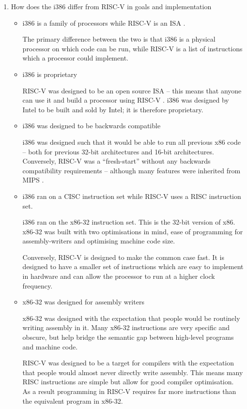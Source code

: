 \documentclass[10pt,\jkfside,a4paper]{article}
\begin{document}
\begin{enumerate}
\begin{itemize}
\end{itemize}

\item How does the i386 differ from RISC-V in goals and implementation

\begin{itemize}

\item i386 is a family of processors while RISC-V is an ISA .

The primary difference between the two is that i386 is a physical processor
on which code can be run, while RISC-V is a list of instructions which a
processor could implement.

\item i386 is proprietary

RISC-V was designed to be an open source ISA -- this means that anyone can
use it and build a processor using RISC-V . i386 was designed by Intel to be
built and sold by Intel; it is therefore proprietary.

\item i386 was designed to be backwards compatible

i386 was designed such that it would be able to run all previous x86 code --
both for previous 32-bit architectures and 16-bit architectures. Conversely,
RISC-V was a ``fresh-start'' without any backwards compatibility
requirements -- although many features were inherited from MIPS .

\item i386 ran on a CISC instruction set while RISC-V uses a RISC
instruction set.

i386 ran on the x86-32 instruction set. This is the 32-bit version of x86.
x86-32 was built with two optimisations in mind, ease of programming for
assembly-writers and optimising machine code size.

Conversely, RISC-V is designed to make the common case fast. It is designed
to have a smaller set of instructions which are easy to implement in
hardware and can allow the processor to run at a higher clock frequency.

\item x86-32 was designed for assembly writers

x86-32 was designed with the expectation that people would be routinely
writing assembly in it. Many x86-32 instructions are very specific and
obscure, but help bridge the semantic gap between high-level programs and
machine code.

RISC-V was designed to be a target for compilers with the expectation that
people would almost never directly write assembly. This means many RISC
instructions are simple but allow for good compiler optimisation. As a
result programming in RISC-V requires far more instructions than the
equivalent program in x86-32.


\end{itemize}
\end{enumerate}
\end{document}
